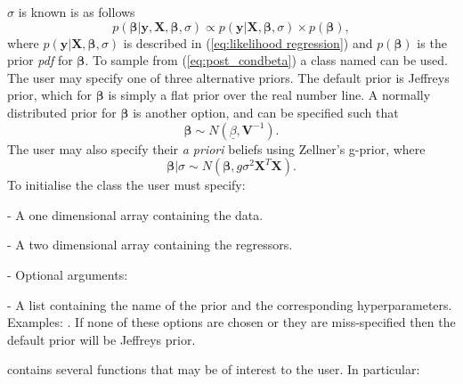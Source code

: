 \documentclass[article]{jss}
\begin{document}
$\sigma$ is known is as follows
\begin{equation} 
p\left(\bm{\beta}|\bm{y},\bm{X},\bm{\beta},\sigma\right)\propto
  p(\bm{y}|\bm{X},\bm{\beta},\sigma)\times
  p(\bm{\beta}),\label{eq:post_condbeta}
\end{equation} where
$p(\bm{y}|\bm{X},\bm{\beta},\sigma)$ is described in
(\ref{eq:likelihood regression}) and $p(\bm{\beta})$ is the prior
\emph{pdf} for $\bm{\beta}.$ To sample from (\ref{eq:post_condbeta}) a
class named  can be used. The user may
specify one of three alternative priors.  The default prior is
Jeffreys prior, which for $\bm{\beta}$ is simply a flat prior over
the real number line. A normally distributed prior for $\bm{\beta}$ is
another option, and can be specified such that\[ \bm{\beta}\sim
N\left(\underline{\beta},\bm{V}^{-1}\right).\] The user may also
specify their \emph{a priori} beliefs using Zellner's g-prior, where\[
\bm{\beta}|\sigma\sim
N\left(\bm{\beta},g\sigma^{2}\bm{X}^{T}\bm{X}\right).\] To initialise
the class the user must specify:
\begin{description}
\item {} - A one dimensional  array containing the
  data.
\item {} - A two dimensional  array containing the
  regressors.
\item {} - Optional arguments:

\begin{description}
\item {} - A list containing the name of the prior and the
  corresponding hyperparameters. Examples: . If none of
  these options are chosen or they are miss-specified then the default
  prior will be Jeffreys prior.
\end{description}
\end{description}
 contains several functions that may be of
interest to the user. In particular:
\end{document}

